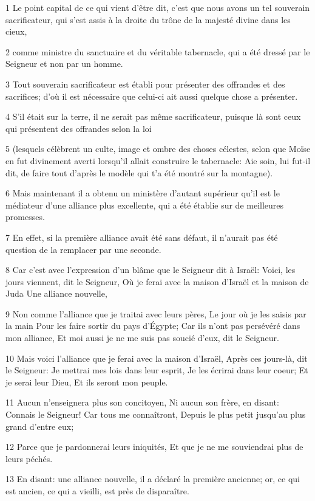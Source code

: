 \par 1 Le point capital de ce qui vient d'être dit, c'est que nous avons un tel souverain sacrificateur, qui s'est assis à la droite du trône de la majesté divine dans les cieux,
\par 2 comme ministre du sanctuaire et du véritable tabernacle, qui a été dressé par le Seigneur et non par un homme.
\par 3 Tout souverain sacrificateur est établi pour présenter des offrandes et des sacrifices; d'où il est nécessaire que celui-ci ait aussi quelque chose a présenter.
\par 4 S'il était sur la terre, il ne serait pas même sacrificateur, puisque là sont ceux qui présentent des offrandes selon la loi
\par 5 (lesquels célèbrent un culte, image et ombre des choses célestes, selon que Moïse en fut divinement averti lorsqu'il allait construire le tabernacle: Aie soin, lui fut-il dit, de faire tout d'après le modèle qui t'a été montré sur la montagne).
\par 6 Mais maintenant il a obtenu un ministère d'autant supérieur qu'il est le médiateur d'une alliance plus excellente, qui a été établie sur de meilleures promesses.
\par 7 En effet, si la première alliance avait été sans défaut, il n'aurait pas été question de la remplacer par une seconde.
\par 8 Car c'est avec l'expression d'un blâme que le Seigneur dit à Israël: Voici, les jours viennent, dit le Seigneur, Où je ferai avec la maison d'Israël et la maison de Juda Une alliance nouvelle,
\par 9 Non comme l'alliance que je traitai avec leurs pères, Le jour où je les saisis par la main Pour les faire sortir du pays d'Égypte; Car ils n'ont pas persévéré dans mon alliance, Et moi aussi je ne me suis pas soucié d'eux, dit le Seigneur.
\par 10 Mais voici l'alliance que je ferai avec la maison d'Israël, Après ces jours-là, dit le Seigneur: Je mettrai mes lois dans leur esprit, Je les écrirai dans leur coeur; Et je serai leur Dieu, Et ils seront mon peuple.
\par 11 Aucun n'enseignera plus son concitoyen, Ni aucun son frère, en disant: Connais le Seigneur! Car tous me connaîtront, Depuis le plus petit jusqu'au plus grand d'entre eux;
\par 12 Parce que je pardonnerai leurs iniquités, Et que je ne me souviendrai plus de leurs péchés.
\par 13 En disant: une alliance nouvelle, il a déclaré la première ancienne; or, ce qui est ancien, ce qui a vieilli, est près de disparaître.

